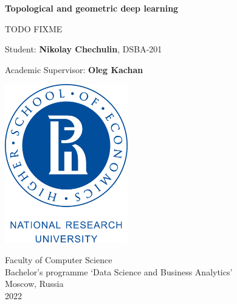 \graphicspath{ {./assets/} }

\begin{titlepage}
   \begin{center}
        \vspace*{1cm}
        
        {\huge \textbf{Topological and geometric deep learning}}
        
        \vspace{0.5cm}
        {\large TODO FIXME }
        
        \vspace{1.5cm}
        
        {\large Student: \textbf{Nikolay Chechulin}, DSBA-201}

        {\large Academic Supervisor: \textbf{Oleg Kachan}}
        
        \vfill
        \vspace{1.5cm}
        
        \includegraphics[width=0.4\textwidth]{Higher_School_of_Economics_Logo}
        
        Faculty of Computer Science\\            
        Bachelor's programme `Data Science and Business Analytics'\\
        Moscow, Russia\\
        2022
            
   \end{center}
\end{titlepage}
